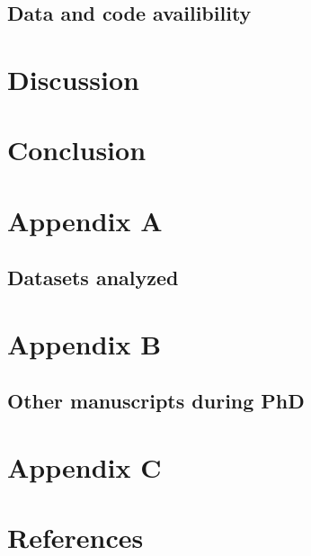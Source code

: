 \documentclass[12pt,twoside]{reedthesis}
\begin{document}
\hypertarget{data-and-code-availibility}{%
\section{Data and code availibility}\label{data-and-code-availibility}}

\hypertarget{discussion}{%
\chapter*{Discussion}\label{discussion}}

\hypertarget{conclusion}{%
\chapter*{Conclusion}\label{conclusion}}

\hypertarget{aa}{%
\chapter*{Appendix A}\label{aa}}

\hypertarget{datasets-analyzed}{%
\section{Datasets analyzed}\label{datasets-analyzed}}

\hypertarget{ab}{%
\chapter*{Appendix B}\label{ab}}

\hypertarget{other-manuscripts-during-phd}{%
\section{Other manuscripts during PhD}\label{other-manuscripts-during-phd}}

\hypertarget{ac}{%
\chapter*{Appendix C}\label{ac}}

\backmatter

\hypertarget{references-2}{%
\chapter*{References}\label{references-2}}
\end{document}

